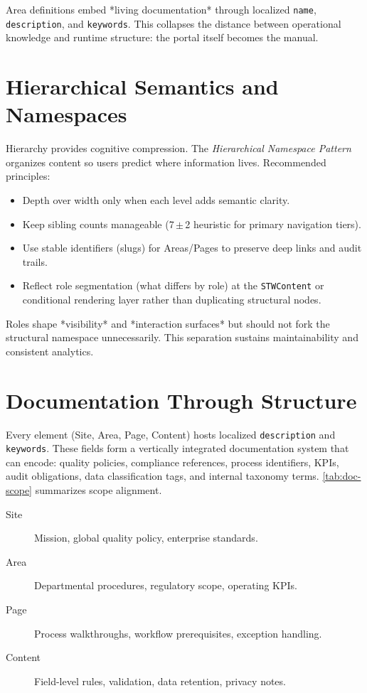 Area definitions embed *living documentation* through localized \texttt{name}, \texttt{description}, and \texttt{keywords}. This collapses the distance between operational knowledge and runtime structure: the portal itself becomes the manual.

\section{Hierarchical Semantics and Namespaces}
Hierarchy provides cognitive compression. The \emph{Hierarchical Namespace Pattern} organizes content so users predict where information lives. Recommended principles:
\begin{itemize}
	\item Depth over width only when each level adds semantic clarity.
	\item Keep sibling counts manageable (7\,$\pm$\,2 heuristic for primary navigation tiers).
	\item Use stable identifiers (slugs) for Areas/Pages to preserve deep links and audit trails.
	\item Reflect role segmentation (what differs by role) at the \texttt{STWContent} or conditional rendering layer rather than duplicating structural nodes.
\end{itemize}
Roles shape *visibility* and *interaction surfaces* but should not fork the structural namespace unnecessarily. This separation sustains maintainability and consistent analytics.

\section{Documentation Through Structure}
Every \wbol{} element (Site, Area, Page, Content) hosts localized \texttt{description} and \texttt{keywords}. These fields form a vertically integrated documentation system that can encode: quality policies, compliance references, process identifiers, KPIs, audit obligations, data classification tags, and internal taxonomy terms. \autoref{tab:doc-scope} summarizes scope alignment.

\begin{description}
	\item[Site] Mission, global quality policy, enterprise standards.
	\item[Area] Departmental procedures, regulatory scope, operating KPIs.
	\item[Page] Process walkthroughs, workflow prerequisites, exception handling.
	\item[Content] Field-level rules, validation, data retention, privacy notes.
\end{description}

